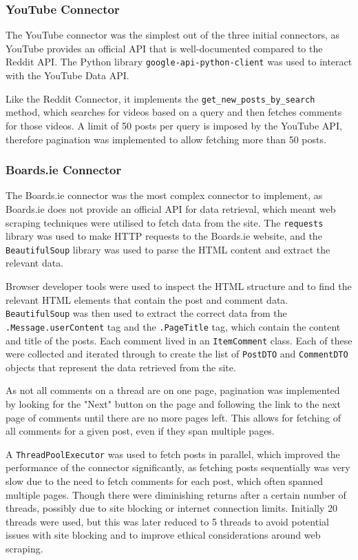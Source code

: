 \documentclass[12pt, a4paper]{article}
\begin{document}
\subsubsection{YouTube Connector}
The YouTube connector was the simplest out of the three initial connectors, as YouTube provides an official API that is well-documented compared to the Reddit API. The Python library \texttt{google-api-python-client} was used to interact with the YouTube Data API.

Like the Reddit Connector, it implements the \texttt{get\_new\_posts\_by\_search} method, which searches for videos based on a query and then fetches comments for those videos. A limit of 50 posts per query is imposed by the YouTube API, therefore pagination was implemented to allow fetching more than 50 posts.

\subsubsection{Boards.ie Connector}
The Boards.ie connector was the most complex connector to implement, as Boards.ie does not provide an official API for data retrieval, which meant web scraping techniques were utilised to fetch data from the site. The \texttt{requests} library was used to make HTTP requests to the Boards.ie website, and the \texttt{BeautifulSoup} library was used to parse the HTML content and extract the relevant data.

Browser developer tools were used to inspect the HTML structure and to find the relevant HTML elements that contain the post and comment data. \texttt{BeautifulSoup} was then used to extract the correct data from the \texttt{.Message.userContent} tag and the \texttt{.PageTitle} tag, which contain the content and title of the posts. Each comment lived in an \texttt{ItemComment} class. Each of these were collected and iterated through to create the list of \texttt{PostDTO} and \texttt{CommentDTO} objects that represent the data retrieved from the site.

As not all comments on a thread are on one page, pagination was implemented by looking for the "Next" button on the page and following the link to the next page of comments until there are no more pages left. This allows for fetching of all comments for a given post, even if they span multiple pages.

A \texttt{ThreadPoolExecutor} was used to fetch posts in parallel, which improved the performance of the connector significantly, as fetching posts sequentially was very slow due to the need to fetch comments for each post, which often spanned multiple pages. Though there were diminishing returns after a certain number of threads, possibly due to site blocking or internet connection limits. Initially 20 threads were used, but this was later reduced to 5 threads to avoid potential issues with site blocking and to improve ethical considerations around web scraping.
\end{document}

